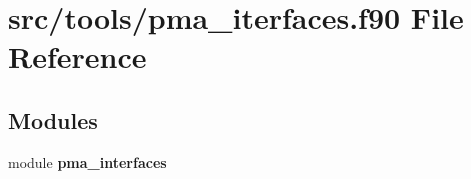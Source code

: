 \section{src/tools/pma\+\_\+iterfaces.f90 File Reference}
\label{pma__iterfaces_8f90}
\subsection*{Modules}
\begin{DoxyCompactItemize}
\item 
module {\bf pma\+\_\+interfaces}
\end{DoxyCompactItemize}
